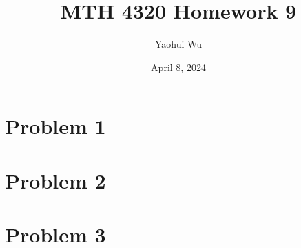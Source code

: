 \documentclass[12pt]{article}
\title{MTH 4320 Homework 9}
\author{Yaohui Wu}
\date{April 8, 2024}
\begin{document}
\maketitle
\section*{Problem 1}
\section*{Problem 2}
\section*{Problem 3}
\end{document}
